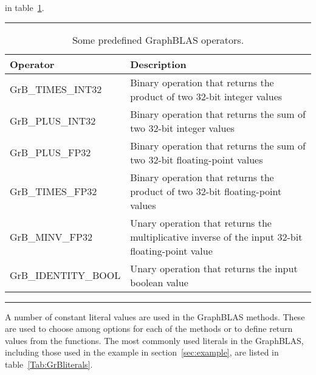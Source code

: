 in table~\ref{Tab:GrBops}. 
\begin{table}[h]
\hrule
\begin{center}
\caption{Some predefined GraphBLAS operators.}
\label{Tab:GrBops}
\begin{tabular}{lp{5.25cm}}
Operator                       & Description  \\
\hline
	{\sf GrB\_TIMES\_INT32}    & Binary operation that returns the product of two 32-bit integer values \\
	{\sf GrB\_PLUS\_INT32}     & Binary operation that returns the sum of two 32-bit integer values \\
	{\sf GrB\_PLUS\_FP32}      & Binary operation that returns the sum of two 32-bit floating-point values \\
	{\sf GrB\_TIMES\_FP32}     & Binary operation that returns the product of two 32-bit floating-point values \\
	{\sf GrB\_MINV\_FP32}      & Unary operation that returns the multiplicative inverse of the input 32-bit floating-point value \\
	{\sf GrB\_IDENTITY\_BOOL}  & Unary operation that returns the input boolean value \\
\end{tabular}
\end{center}
\hrule
\end{table}
A number of constant literal values are used in the GraphBLAS methods.  These are used to 
choose among options for each of the methods or to define return values from the functions.
The most commonly used literals in the GraphBLAS, including those used in the example in 
section~\ref{sec:example}, are listed in table~\ref{Tab:GrBliterals}.
